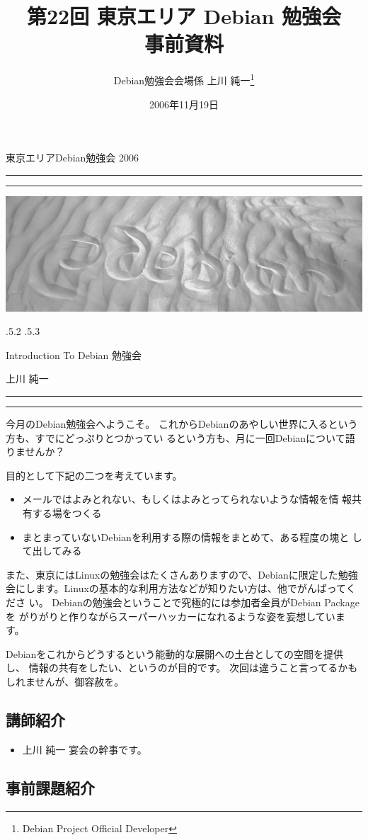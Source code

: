 \documentclass[mingoth,a4paper]{jsarticle}
\makeatletter
\renewcommand{\section}{\@startsection{section}{1}{\z@}%
    {\Cvs \@plus.5\Cdp \@minus.2\Cdp}%
    {.5\Cvs \@plus.3\Cdp}%
    {\normalfont\Huge\headfont\raggedright\centering}} %
\newcommand{\dancersection}[2]{%
\newpage
東京エリアDebian勉強会 2006
\hrule
\vspace{0.5mm}
\hrule
\hfill{}\includegraphics[width=16cm]{image2006-natsu/guruguru-sand-light.png}\\
\vspace{-5cm}
\begin{center}
\section{#1}
\end{center}
\hfill{}\colorbox{white}{#2}\hspace{3cm}\space\\
\vspace{1cm}
\hrule
\vspace{0.5mm}
\hrule
\vspace{1cm}
}
\makeatother
\begin{document}
\begin{titlepage}

\title{
 第22回 東京エリア Debian 勉強会\\事前資料}
\date{2006年11月19日}
\author{Debian勉強会会場係 上川 純一\thanks{Debian Project Official Developer}} 
\maketitle
\thispagestyle{empty}
\end{titlepage}

\newpage
\tableofcontents

\dancersection{Introduction To Debian 勉強会}{上川 純一}

今月のDebian勉強会へようこそ。
これからDebianのあやしい世界に入るという方も、すでにどっぷりとつかってい
るという方も、月に一回Debianについて語りませんか？

目的として下記の二つを考えています。

\begin{itemize}
 \item メールではよみとれない、もしくはよみとってられないような情報を情
       報共有する場をつくる
 \item まとまっていないDebianを利用する際の情報をまとめて、ある程度の塊と
       して出してみる
\end{itemize}

また、東京にはLinuxの勉強会はたくさんありますので、Debianに限定した勉強
会にします。Linuxの基本的な利用方法などが知りたい方は、他でがんばってくださ
い。
Debianの勉強会ということで究極的には参加者全員がDebian Packageを
がりがりと作りながらスーパーハッカーになれるような姿を妄想しています。

Debianをこれからどうするという能動的な展開への土台としての空間を提供し、
情報の共有をしたい、というのが目的です。
次回は違うこと言ってるかもしれませんが、御容赦を。

\subsection{講師紹介}

\begin{itemize}
 \item{上川 純一} 宴会の幹事です。
\end{itemize}

\subsection{事前課題紹介}
\end{document}
